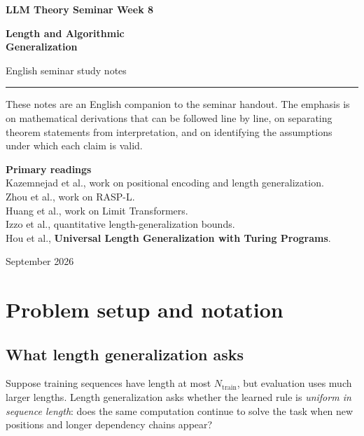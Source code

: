 \documentclass[11pt,a4paper,oneside,openany]{memoir}
\theoremstyle{definition}
\begin{document}
\begin{titlingpage}
\thispagestyle{empty}
\vspace*{1.2cm}
{\small\bfseries LLM Theory Seminar \hfill Week 8\par}
\vspace{1.4cm}
{\HUGE\bfseries Length and Algorithmic\\[0.18em]Generalization\par}
\vspace{0.55cm}
{\large English seminar study notes\par}
\vspace{0.9cm}
\rule{\textwidth}{0.7pt}
\vspace{1.1cm}
\begin{minipage}{0.86\textwidth}
\small
These notes are an English companion to the seminar handout.  The emphasis is on
mathematical derivations that can be followed line by line, on separating theorem
statements from interpretation, and on identifying the assumptions under which each
claim is valid.
\end{minipage}
\vfill
{\small\textbf{Primary readings}\\[0.25em]
Kazemnejad et al., work on positional encoding and length generalization.\\Zhou et al., work on RASP-L.\\Huang et al., work on Limit Transformers.\\Izzo et al., quantitative length-generalization bounds.\\Hou et al., \textbf{Universal Length Generalization with Turing Programs}.
\par}
\vspace{0.8cm}
{\small September 2026\par}
\end{titlingpage}
\tableofcontents*
\clearpage

\chapter{Problem setup and notation}
\section{What length generalization asks}
Suppose training sequences have length at most $N_{\mathrm{train}}$, but evaluation uses much larger lengths.  Length generalization asks whether the learned rule is \emph{uniform in sequence length}: does the same computation continue to solve the task when new positions and longer dependency chains appear?
\end{document}

